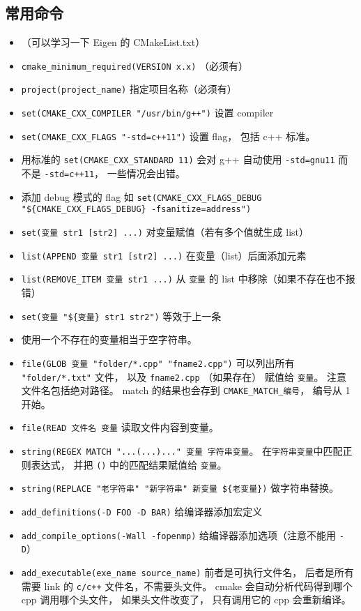 \subsection{常用命令}
\begin{itemize}
\item （可以学习一下 Eigen 的 CMakeList.txt）
\item \verb`cmake_minimum_required(VERSION x.x)` （必须有）
\item \verb`project(project_name)` 指定项目名称（必须有）
\item \verb|set(CMAKE_CXX_COMPILER "/usr/bin/g++")| 设置 compiler
\item \verb|set(CMAKE_CXX_FLAGS "-std=c++11")| 设置 flag， 包括 c++ 标准。
\item 用标准的 \verb|set(CMAKE_CXX_STANDARD 11)| 会对 g++ 自动使用 \verb|-std=gnu11| 而不是 \verb|-std=c++11|， 一些情况会出错。
\item 添加 debug 模式的 flag 如 \verb|set(CMAKE_CXX_FLAGS_DEBUG "${CMAKE_CXX_FLAGS_DEBUG} -fsanitize=address")|
\item \verb`set(变量 str1 [str2] ...)` 对变量赋值（若有多个值就生成 list）
\item \verb`list(APPEND 变量 str1 [str2] ...)` 在变量（list）后面添加元素
\item \verb|list(REMOVE_ITEM 变量 str1 ...)| 从 \verb|变量| 的 list 中移除（如果不存在也不报错）
\item \verb|set(变量 "${变量} str1 str2")| 等效于上一条
\item 使用一个不存在的变量相当于空字符串。
\item \verb`file(GLOB 变量 "folder/*.cpp" "fname2.cpp")` 可以列出所有 \verb|"folder/*.txt"| 文件， 以及 \verb|fname2.cpp| （如果存在） 赋值给 \verb|变量|。 注意文件名包括绝对路径。 match 的结果也会存到 \verb|CMAKE_MATCH_编号|， 编号从 1 开始。
\item \verb|file(READ 文件名 变量| 读取文件内容到变量。
\item \verb|string(REGEX MATCH "...(...)..." 变量 字符串变量|。 在\verb|字符串变量|中匹配正则表达式， 并把 \verb|()| 中的匹配结果赋值给 \verb|变量|。
\item \verb|string(REPLACE "老字符串" "新字符串" 新变量 ${老变量})| 做字符串替换。
\item \verb|add_definitions(-D FOO -D BAR)| 给编译器添加宏定义
\item \verb|add_compile_options(-Wall -fopenmp)| 给编译器添加选项（注意不能用 \verb|-D|）
\item \verb`add_executable(exe_name source_name)` 前者是可执行文件名， 后者是所有需要 link 的 \verb|c/c++| 文件名，不需要头文件。 cmake 会自动分析代码得到哪个 cpp 调用哪个头文件， 如果头文件改变了， 只有调用它的 cpp 会重新编译。

\end{itemize}
